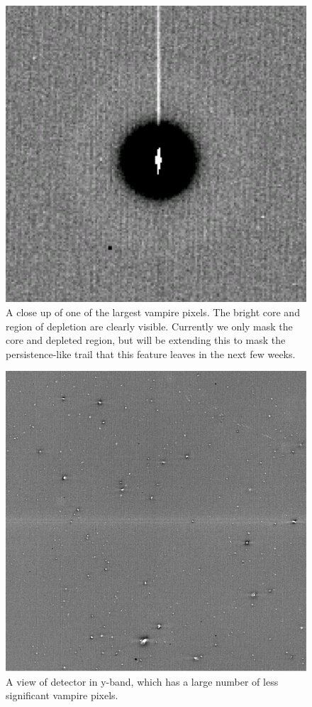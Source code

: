 \begin{figure}
  \includegraphics{figures/isr-f03-vampire_pixel.png}
  \caption{A close up of one of the largest vampire pixels.  The bright core and region of depletion are clearly visible.  Currently we only mask the core and depleted region, but will be extending this to mask the persistence-like trail that this feature leaves in the next few weeks.}
\end{figure}

\begin{figure}
  \includegraphics{figures/isr-f04-vampire_pixels_y_det03.png}
  \caption{A view of detector  in y-band, which has a large number of less significant vampire pixels.}
\end{figure}



